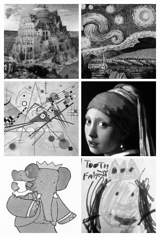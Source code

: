 \documentclass[letterpaper, 10pt, conference]{ieeeconf}
\begin{document}
\begin{figure}
\includegraphics[width=.15\textwidth]{maps/breugel_babel} \hfill
\includegraphics[width=.15\textwidth]{maps/van-gogh_starry-night} \hfill
\includegraphics[width=.15\textwidth]{maps/kandinsky_comp-8} \hfill
\includegraphics[width=.15\textwidth]{maps/vermeer_girl-pearl} \hfill
\includegraphics[width=.15\textwidth]{maps/babar} \hfill
\includegraphics[width=.15\textwidth]{maps/childs-drawing_tooth-fairy}

\hfill
{}\hfill
{}\hfill
{}\hfill
{}\hfill
{}


\end{figure}
\end{document}
